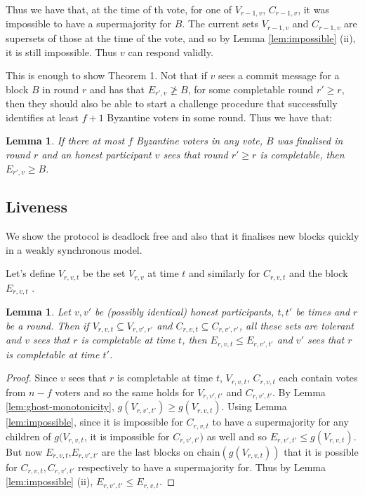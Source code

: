 \documentclass{article}
\newtheorem{lemma}[theorem]{Lemma}
\begin{document}
{Thus we have that, at the time of th vote, for one of $V_{r-1,v}$, $C_{r-1,v}$, it was impossible to have a supermajority for $B$. The current sets $V_{r-1,v}$ and $C_{r-1,v}$ are supersets of those at the time of the vote, and so by Lemma \ref{lem:impossible} (ii), it is still impossible. Thus $v$ can respond validly.


This is enough to show Theorem 1. Not that if $v$ sees a commit message for a block $B$ in round $r$ and has that $E_{r',v} \not\geq B$, for some completable round $r' \geq r$, then they should also be able to start a challenge procedure that successfully identifies at least $f+1$ Byzantine voters in some round. Thus we have that:

\begin{lemma} \label{lem:overestimate-final}
If there at most $f$ Byzantine voters in any vote, $B$ was finalised in round $r$ and an honest participant $v$ sees that round $r' \geq r$ is completable, then $E_{r',v} \geq B$.
\end{lemma}

\subsection{Liveness }

We show the protocol is deadlock free and also that it finalises new blocks quickly in a weakly synchronous model.

Let's define $V_{r,v,t}$ be the set $V_{r,v}$ at time $t$ and similarly for $C_{r,v,t}$ and the block $E_{r,v,t}$ .


\begin{lemma} \label{lem:message-monotonicity-completed-estimate}
 Let $v,v'$ be (possibly identical) honest participants, $t,t'$ be times and $r$ be a round. Then if $V_{r,v,t} \subseteq V_{r,v',r'}$ and $C_{r,v,t} \subseteq C_{r,v',r'}$, all these sets are tolerant and $v$ sees that $r$ is completable at time $t$, then $E_{r,v,t} \leq E_{r,v',t'}$ and $v'$ sees that $r$ is completable at time $t'$.
\end{lemma}

\begin{proof} Since $v$ sees that $r$ is completable at time $t$, $V_{r,v,t}$, $C_{r,v,t}$ each contain votes from $n-f$ voters and so the same holds for $V_{r,v',t'}$ and $C_{r,v',t'}$. 
By Lemma \ref{lem:ghost-monotonicity}, $g(V_{r,v',t'}) \geq g(V_{r,v,t})$.
 Using Lemma \ref{lem:impossible}, since it is impossible for $C_{r,v,t}$ to have a supermajority for any children of $g(V_{r,v,t}$, it is impossible for $C_{r,v',t'})$ as well and so $E_{r,v',t'} \leq g(V_{r,v,t})$. But now $E_{r,v,t}$,$E_{r,v',t'}$ are the last blocks on $\textrm{chain}(g(V_{r,v,t}))$ that it is possible for $C_{r,v,t},C_{r,v',t'}$ respectively to have a supermajority for. Thus by Lemma \ref{lem:impossible} (ii), $E_{r,v',t'} \leq E_{r,v,t}$.
\end{proof}
 
}
\end{document}
